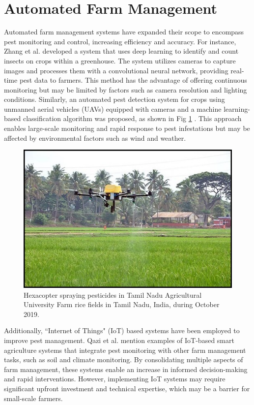 \section{Automated Farm Management}
Automated farm management systems have expanded their scope to encompass pest monitoring and control, increasing efficiency and accuracy. For instance, Zhang et al. \cite{zhang_bu_wang_2022} developed a system that uses deep learning to identify and count insects on crops within a greenhouse. The system utilizes cameras to capture images and processes them with a convolutional neural network, providing real-time pest data to farmers. This method has the advantage of offering continuous monitoring but may be limited by factors such as camera resolution and lighting conditions. Similarly, an automated pest detection system for crops using unmanned aerial vehicles (UAVs) equipped with cameras and a machine learning-based classification algorithm was proposed, as shown in Fig \ref{fig:2.1} \cite{10.3389/fagro.2021.640885, app13031851}. This approach enables large-scale monitoring and rapid response to pest infestations but may be affected by environmental factors such as wind and weather.

\begin{figure}[H]
\begin{center}
\includegraphics[width=0.85\linewidth]{Honors_Thesis/Figures/2.1.jpg}
\end{center}
\caption{Hexacopter spraying pesticides in Tamil Nadu Agricultural University Farm rice fields in Tamil Nadu, India, during October 2019.}
\label{fig:2.1}
\end{figure}

Additionally, ``Internet of Things" (IoT) based systems have been employed to improve pest management. Qazi et al. \cite{9716089} mention examples of IoT-based smart agriculture systems that integrate pest monitoring with other farm management tasks, such as soil and climate monitoring. By consolidating multiple aspects of farm management, these systems enable an increase in informed decision-making and rapid interventions. However, implementing IoT systems may require significant upfront investment and technical expertise, which may be a barrier for small-scale farmers.

